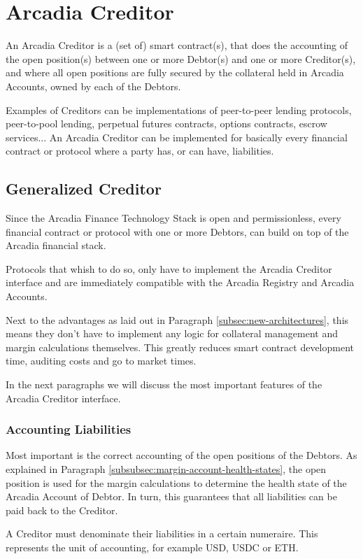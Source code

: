 \documentclass[sigconf,nonacm]{acmart}
\begin{document}
\section{Arcadia Creditor}
\label{sec:arcadia-creditor}
An Arcadia Creditor is a (set of) smart contract(s),
that does the accounting of the open position(s) between one or more Debtor(s) and one or more Creditor(s),
and where all open positions are fully secured by the collateral held in Arcadia Accounts,
owned by each of the Debtors.

Examples of Creditors can be implementations of peer-to-peer lending protocols, peer-to-pool lending, perpetual futures contracts, options contracts, escrow services...
An Arcadia Creditor can be implemented for basically every financial contract or protocol where a party has, or can have, liabilities.

\subsection{Generalized Creditor}
Since the Arcadia Finance Technology Stack is open and permissionless,
every financial contract or protocol with one or more Debtors,
can build on top of the Arcadia financial stack.

Protocols that whish to do so, only have to implement the Arcadia Creditor interface
and are immediately compatible with the Arcadia Registry and Arcadia Accounts.

Next to the advantages as laid out in Paragraph \ref{subsec:new-architectures},
this means they don't have to implement any logic for collateral management and margin calculations themselves.
This greatly reduces smart contract development time, auditing costs and go to market times.

In the next paragraphs we will discuss the most important features of the Arcadia Creditor interface.

\subsubsection{Accounting Liabilities}
Most important is the correct accounting of the open positions of the Debtors.
As explained in Paragraph \ref{subsubsec:margin-account-health-states},
the open position is used for the margin calculations to determine the health state of the Arcadia Account of Debtor.
In turn, this guarantees that all liabilities can be paid back to the Creditor.

A Creditor must denominate their liabilities in a certain numeraire.
This represents the unit of accounting, for example USD, USDC or ETH.
\end{document}
